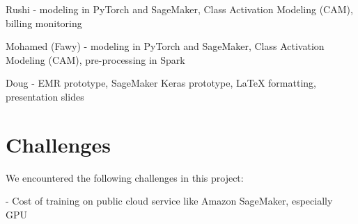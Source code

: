 \documentclass{amia}
\begin{document}
Rushi - modeling in PyTorch and SageMaker, Class Activation Modeling (CAM), billing monitoring

Mohamed (Fawy) - modeling in PyTorch and SageMaker, Class Activation Modeling (CAM), pre-processing in Spark

Doug - EMR prototype, SageMaker Keras prototype, LaTeX formatting, presentation slides

\section*{Challenges}

We encountered the following challenges in this project:

- Cost of training on public cloud service like Amazon SageMaker, especially GPU



\makeatletter

\let\oldsection\section
\renewcommand\section{\clearpage\oldsection}


\renewcommand{\@biblabel}[1]{\hfill #1.}
\makeatother
\end{document}
